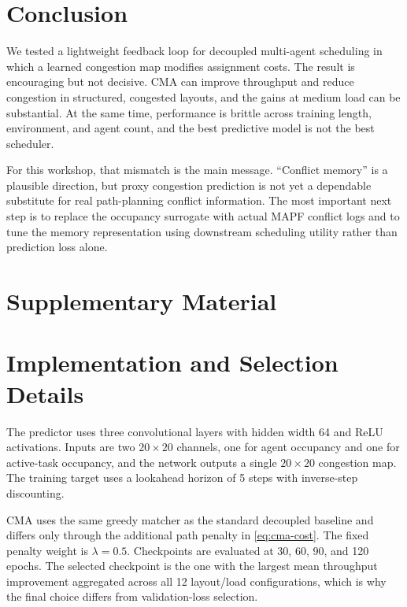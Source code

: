 \section{Conclusion}
\label{sec:conclusion}

We tested a lightweight feedback loop for decoupled multi-agent scheduling in which a learned congestion map modifies assignment costs. The result is encouraging but not decisive. CMA can improve throughput and reduce congestion in structured, congested layouts, and the gains at medium load can be substantial. At the same time, performance is brittle across training length, environment, and agent count, and the best predictive model is not the best scheduler.

For this workshop, that mismatch is the main message. ``Conflict memory'' is a plausible direction, but proxy congestion prediction is not yet a dependable substitute for real path-planning conflict information. The most important next step is to replace the occupancy surrogate with actual MAPF conflict logs and to tune the memory representation using downstream scheduling utility rather than prediction loss alone.




\appendix

\section*{\LARGE Supplementary Material}

\section{Implementation and Selection Details}
The predictor uses three convolutional layers with hidden width 64 and ReLU activations. Inputs are two $20 \times 20$ channels, one for agent occupancy and one for active-task occupancy, and the network outputs a single $20 \times 20$ congestion map. The training target uses a lookahead horizon of 5 steps with inverse-step discounting.

CMA uses the same greedy matcher as the standard decoupled baseline and differs only through the additional path penalty in \cref{eq:cma-cost}. The fixed penalty weight is $\lambda=0.5$. Checkpoints are evaluated at 30, 60, 90, and 120 epochs. The selected checkpoint is the one with the largest mean throughput improvement aggregated across all 12 layout/load configurations, which is why the final choice differs from validation-loss selection.

